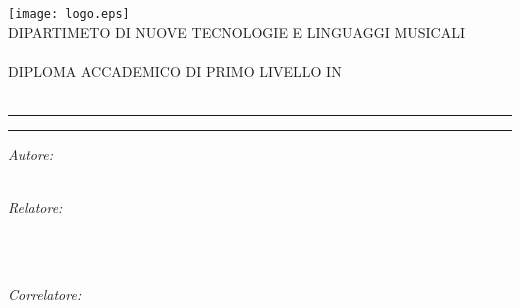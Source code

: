 
\begin{titlepage}
  \begin{center}
    {\LARGE
      \texttt{[image: logo.eps]} \\[0.5cm]

      {\normalsize{DIPARTIMETO DI NUOVE TECNOLOGIE E LINGUAGGI MUSICALI}} \\[-0.2cm]
      {} \\[0.5cm]

      {\normalsize{DIPLOMA ACCADEMICO DI PRIMO LIVELLO IN}} \\[-0.2cm]
      {} \\[1.414cm]

      {\huge{\spacedlowsmallcaps{\myName}}}\vspace{-0.3cm}
      \par\noindent\rule{\textwidth}{0.4pt}\vspace{0.3cm}
      {\Huge{\color{bbari}\spacedallcaps{\myTitle}}}
      \par\noindent\rule{\textwidth}{0.4pt}\vspace{0.3cm}
      {\spacedlowsmallcaps{\mySubTitle}}
    }

    \vspace{2.718cm}

    \begin{minipage}[t]{0.49\textwidth}
    \begin{flushleft} \large
    \emph{Autore:}\\
    \spacedlowsmallcaps{\myName}\\
    \end{flushleft}
    \end{minipage}
    \begin{minipage}[t]{0.49\textwidth}
    \begin{flushright} \large
    \emph{Relatore:} \\
    \\
    \end{flushright}
    \end{minipage}\\[0.5cm]
    \begin{minipage}[t]{0.99\textwidth}
    \begin{flushright} \large
    \emph{Correlatore:} \\
    \\
    \end{flushright}
    \end{minipage}\\[3cm]


\end{center}
\end{titlepage}
